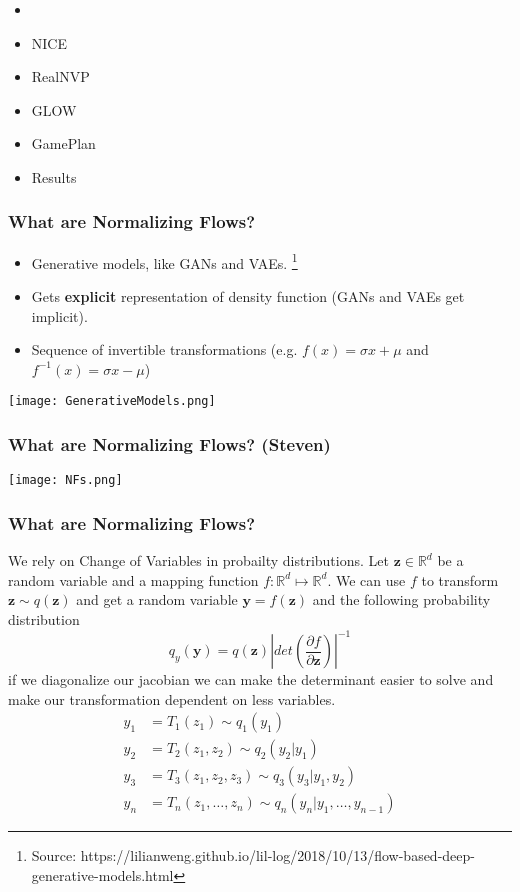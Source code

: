 \begin{frame}
\begin{itemize}
    \item \textbf{\color{red}{What are Normalizing Flows}}
    \item NICE
    \item RealNVP
    \item GLOW
    \item GamePlan
    \item Results
\end{itemize}
\end{frame}

\begin{frame}
    \frametitle{What are Normalizing Flows?}
    \begin{itemize}
        \item Generative models, like GANs and VAEs.  \footnote{Source:
    https://lilianweng.github.io/lil-log/2018/10/13/flow-based-deep-generative-models.html}
        \item Gets \textbf{explicit} representation of density function (GANs
            and VAEs get implicit).
        \item Sequence of invertible transformations (e.g. $f(x) = \sigma x +
            \mu$ and $f^{-1}(x) = \sigma x - \mu$)
    \end{itemize}
    \center\texttt{[image: GenerativeModels.png]}
\end{frame}

\begin{frame}
    \frametitle{What are Normalizing Flows? (Steven)}
    \center\texttt{[image: NFs.png]}
\end{frame}

\begin{frame}
    \frametitle{What are Normalizing Flows?}
    We rely on Change of Variables in probailty distributions. Let
    $\mathbf{z}\in \mathbb{R}^d$ be a random variable and a mapping function $f:
    \mathbb{R}^d \mapsto \mathbb{R}^d$. We can use $f$ to transform
    $\mathbf{z}\sim q(\mathbf{z})$ and get a random variable $\mathbf{y} =
    f(\mathbf{z})$ and the following probability distribution
    \[
        q_y(\mathbf{y}) = q(\mathbf{z})\left | det(\frac{\partial
        f}{\partial \mathbf{z}}) \right | ^{-1}
    \]
    if we diagonalize our jacobian we can make the determinant easier to solve
    and make our transformation dependent on less variables. 
    \begin{align*}
        y_1 &= T_1(z_1)\sim q_1(y_1)\\
        y_2 &= T_2(z_1,z_2)\sim q_2(y_2 | y_1)\\
        y_3 &= T_3(z_1,z_2,z_3)\sim q_3(y_3|y_1,y_2)\\
        y_n &= T_n(z_1,\dots,z_n)\sim q_n(y_n|y_1,\dots,y_{n-1})
    \end{align*}

\end{frame}

